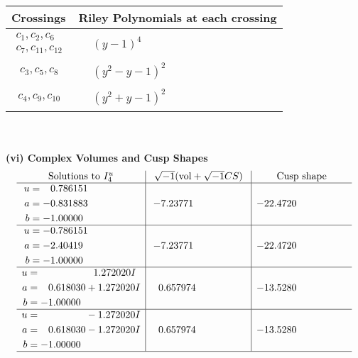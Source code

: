 \documentclass[1p]{elsarticle_modified}
\theoremstyle{definition}
\newcommand{\I}{\sqrt{-1}}
\begin{document}
\begin{tabular}{m{50pt}|m{274pt}}
Crossings & \hspace{64pt}Riley Polynomials at each crossing \\
\hline $$\begin{aligned}c_{1},c_{2},c_{6}\\c_{7},c_{11},c_{12}\end{aligned}$$&$\begin{aligned}
&(y-1)^4
\end{aligned}$\\
\hline $$\begin{aligned}c_{3},c_{5},c_{8}\end{aligned}$$&$\begin{aligned}
&(y^2- y-1)^2
\end{aligned}$\\
\hline $$\begin{aligned}c_{4},c_{9},c_{10}\end{aligned}$$&$\begin{aligned}
&(y^2+y-1)^2
\end{aligned}$\\
\hline
\end{tabular}\\~\\
\newpage\flushleft \textbf{(vi) Complex Volumes and Cusp Shapes}
$$\begin{array}{c|c|c}  
\text{Solutions to }I^u_{4}& \I (\text{vol} + \sqrt{-1}CS) & \text{Cusp shape}\\
 \hline 
\begin{aligned}
u &= \phantom{-}0.786151\phantom{ +0.000000I} \\
a &= -0.831883\phantom{ +0.000000I} \\
b &= -1.00000\phantom{ +0.000000I}\end{aligned}
 & -7.23771\phantom{ +0.000000I} & -22.4720\phantom{ +0.000000I} \\ \hline\begin{aligned}
u &= -0.786151\phantom{ +0.000000I} \\
a &= -2.40419\phantom{ +0.000000I} \\
b &= -1.00000\phantom{ +0.000000I}\end{aligned}
 & -7.23771\phantom{ +0.000000I} & -22.4720\phantom{ +0.000000I} \\ \hline\begin{aligned}
u &= \phantom{-0.000000 -}1.272020 I \\
a &= \phantom{-}0.618030 + 1.272020 I \\
b &= -1.00000\phantom{ +0.000000I}\end{aligned}
 & \phantom{-}0.657974\phantom{ +0.000000I} & -13.5280\phantom{ +0.000000I} \\ \hline\begin{aligned}
u &= \phantom{-0.000000 } -1.272020 I \\
a &= \phantom{-}0.618030 - 1.272020 I \\
b &= -1.00000\phantom{ +0.000000I}\end{aligned}
 & \phantom{-}0.657974\phantom{ +0.000000I} & -13.5280\phantom{ +0.000000I}\\
 \hline 
 \end{array}$$\newpage\newpage\renewcommand{\arraystretch}{1}
\end{document}
